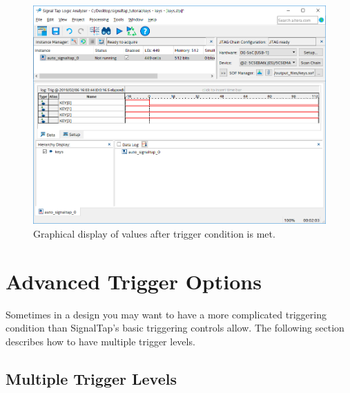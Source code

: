 \documentclass[11pt, twoside, pdftex]{article}
\begin{document}
\begin{figure}[H]
   \begin{center}
      \includegraphics[scale=0.65]{figures/figure13.png}
   \caption{Graphical display of values after trigger condition is met.} 
	 \label{fig:13}
	 \end{center}
\end{figure}

\section{Advanced Trigger Options}
Sometimes in a design you may want to have a more complicated triggering condition than SignalTap's basic
triggering controls allow. The following section describes how to have multiple trigger levels.

\subsection{Multiple Trigger Levels}
\end{document}
